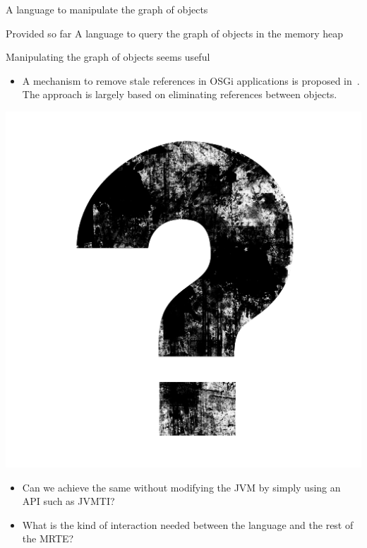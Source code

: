 \documentclass[10pt,xcolor={dvipsnames}]{beamer}
\begin{document}
	\begin{frame}{A language to manipulate the graph of objects}
		\begin{block}{Provided so far}
			A language to query the graph of objects in the memory heap
		\end{block}
		
		\begin{alertblock}{ Manipulating the graph of objects seems useful }
			\begin{itemize}
				\item A mechanism to remove stale references in OSGi applications is proposed in~\cite{dsn:15:attouchi:incinerator}. The approach is largely based on eliminating references between objects.
				
			\end{itemize}
		\end{alertblock}
		
		\begin{alertblock}{\centering \includegraphics[scale=0.03]{fig/questions.png}}
			\begin{itemize}
				\item Can we achieve the same without modifying the JVM by simply using an API such as JVMTI?
				\item What is the kind of interaction needed between the language and the rest of the MRTE?
			\end{itemize}
		\end{alertblock}
	\end{frame}
\end{document}
